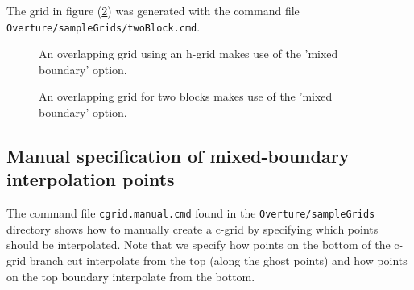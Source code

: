 \documentclass[xcolor=rgb,svgnames,dvipsnames]{article}
\newcommand{\figures}{../fig}
\begin{document}
The grid in figure (\ref{fig:twoBlock}) was generated with the command file
{\tt Overture/sampleGrids/twoBlock.cmd}.

{
\newcommand{\figWidthd}{11cm}
\newcommand{\trimfig}[2]{\trimPlot{#1}{#2}{.0}{.0}{.30}{.30}}
\begin{figure}[hbt]
\begin{center}
\end{center}
  \caption{An overlapping grid using an h-grid makes use of the 'mixed boundary' option.}  \label{fig:hgrid}
\end{figure}
}
% 
{
\newcommand{\figWidthd}{10cm}
\newcommand{\trimfig}[2]{\trimPlot{#1}{#2}{.0}{.0}{.10}{.20}}
\begin{figure}[hbt]
\begin{center}
\end{center}
  \caption{An overlapping grid for two blocks makes use of the 'mixed boundary' option.}  \label{fig:twoBlock}
\end{figure}
}

\subsection{Manual specification of mixed-boundary interpolation points}

The command file {\tt cgrid.manual.cmd} found in the
{\tt Overture\-/sampleGrids} directory shows how to manually create a c-grid by specifying
which points should be interpolated.
Note that we specify how points on the bottom of the c-grid branch cut
interpolate from the top (along the ghost points)
and how points on the top boundary interpolate from the bottom.
\end{document}
